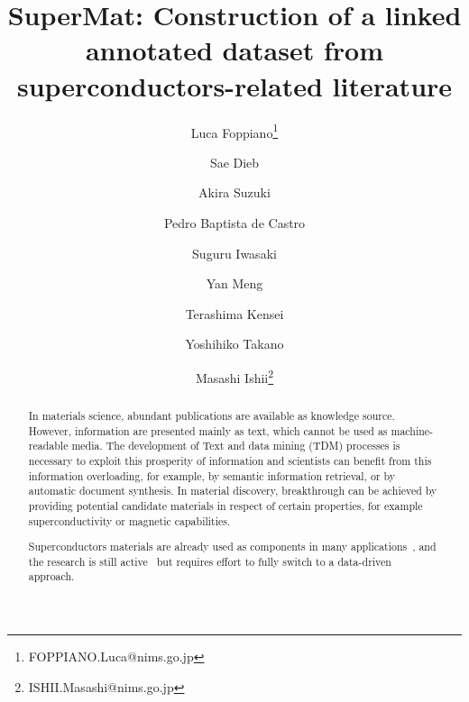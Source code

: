 \documentclass[a4paper,10pt]{article}
\title{SuperMat: Construction of a linked annotated dataset from superconductors-related literature}
\author[1]{Luca Foppiano\thanks{FOPPIANO.Luca@nims.go.jp}}
\author[1]{Sae Dieb}
\author[1]{Akira Suzuki}
\author[2]{Pedro Baptista de Castro}
\author[2]{Suguru Iwasaki}
\author[2]{Yan Meng}
\author[2]{Terashima Kensei}
\author[2]{Yoshihiko Takano}
\author[1]{Masashi Ishii\thanks{ISHII.Masashi@nims.go.jp}}
\affil[1]{Material Database Group, MaDIS, NIMS, Japan}
\affil[2]{Nano Frontier Superconducting Materials Group, MANA, NIMS}
\begin{document}
\maketitle

\begin{abstract}





In materials science, abundant publications are available as knowledge source. However, information are presented mainly as text, which cannot be used as machine-readable media.
The development of Text and data mining (TDM) processes is necessary to exploit this prosperity of information and scientists can benefit from this information overloading, for example, by semantic information retrieval, or by automatic document synthesis. 
In material discovery, breakthrough can be achieved by providing potential candidate materials in respect of certain properties, for example superconductivity or magnetic capabilities. 

Superconductors materials are already used as components in many applications~\cite{Hoshino2015InnovativeLR, Kizu2010ConstructionOT, Cardani2017NewAO, THOMAS201659}, and the research is still active~\cite{Drozdov_2019} but requires effort to fully switch to a data-driven approach\cite{Hamlin2019SuperconductivityNR}. 


\end{abstract}
\end{document}
